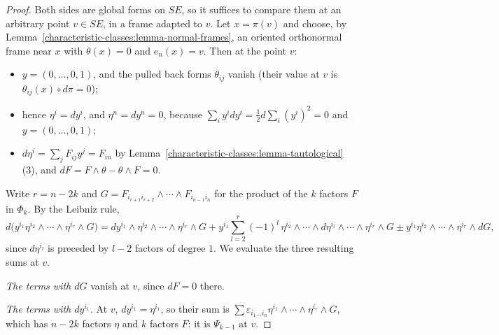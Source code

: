 \begin{proof}
Both sides are global forms on $SE$, so it suffices to compare them at an arbitrary point $v \in SE$, in a frame adapted to $v$. Let $x = \pi(v)$ and choose, by
Lemma~\ref{characteristic-classes:lemma-normal-frames}, an oriented orthonormal frame near $x$ with $\theta(x) = 0$ and $e_n(x) = v$. Then at the point $v$:
\begin{itemize}
\item $y = (0, \ldots, 0, 1)$, and the pulled back forms $\theta_{ij}$ vanish (their value at $v$ is $\theta_{ij}(x) \circ d\pi = 0$);
\item hence $\eta^i = dy^i$, and $\eta^n = dy^n = 0$, because $\sum_iy^idy^i = \frac12d\sum_i(y^i)^2 = 0$ and $y = (0, \ldots, 0, 1)$;
\item $d\eta^i = \sum_jF_{ij}y^j = F_{in}$ by Lemma~\ref{characteristic-classes:lemma-tautological}(3), and $dF = F \wedge \theta - \theta \wedge F = 0$.
\end{itemize}
Write $r = n - 2k$ and $G = F_{i_{r+1}i_{r+2}} \wedge \cdots \wedge F_{i_{n-1}i_n}$ for the product of the $k$ factors $F$ in $\Phi_k$. By the Leibniz rule,
\[
d\bigl(y^{i_1}\eta^{i_2} \wedge \cdots \wedge \eta^{i_r} \wedge G\bigr) = dy^{i_1} \wedge \eta^{i_2} \wedge \cdots \wedge \eta^{i_r} \wedge G
+ y^{i_1}\sum_{l=2}^r(-1)^{l}\,\eta^{i_2} \wedge \cdots \wedge d\eta^{i_l} \wedge \cdots \wedge \eta^{i_r} \wedge G \pm y^{i_1}\eta^{i_2} \wedge \cdots \wedge \eta^{i_r} \wedge dG,
\]
since $d\eta^{i_l}$ is preceded by $l - 2$ factors of degree $1$. We evaluate the three resulting sums at $v$.

\emph{The terms with $dG$} vanish at $v$, since $dF = 0$ there.

\emph{The terms with $dy^{i_1}$.} At $v$, $dy^{i_1} = \eta^{i_1}$, so their sum is $\sum\varepsilon_{i_1 \ldots i_n}\eta^{i_1} \wedge \cdots \wedge \eta^{i_r} \wedge G$, which has $n - 2k$ factors $\eta$ and $k$
factors $F$: it is $\Psi_{k-1}$ at $v$.


\end{proof}
